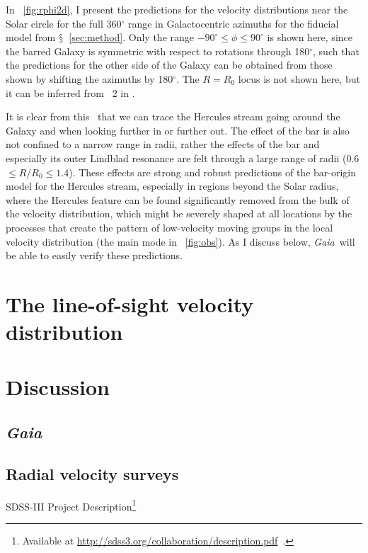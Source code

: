 \documentclass[12pt,preprint]{aastex}
\newcommand{\sectionname}{$\mathsection$}
\newcommand{\Gaia}{\emph{Gaia}}
\newcommand{\Ro}{\ensuremath{R_0}}
\begin{document}
In \figurename~\ref{fig:rphi2d}, I present the predictions for the
velocity distributions near the Solar circle for the full
360$^{\circ}$ range in Galactocentric azimuths for the fiducial model
from \sectionname~\ref{sec:method}. Only the range $-90^{\circ} \leq
\phi \leq 90^{\circ}$ is shown here, since the barred Galaxy is
symmetric with respect to rotations through 180$^{\circ}$, such that
the predictions for the other side of the Galaxy can be obtained from
those shown by shifting the azimuths by 180$^{\circ}$. The $R = \Ro$
locus is not shown here, but it can be inferred from \figurename~2 in
\citet{dehnen00a}.

It is clear from this \figurename\ that we can trace the Hercules
stream going around the Galaxy and when looking further in or further
out. The effect of the bar is also not confined to a narrow range in
radii, rather the effects of the bar and especially its outer Lindblad
resonance are felt through a large range of radii (0.6 $\leq R/\Ro \leq
1.4$). These effects are strong and robust predictions of the
bar-origin model for the Hercules stream, especially in regions beyond
the Solar radius, where the Hercules feature can be found
significantly removed from the bulk of the velocity distribution,
which might be severely shaped at all locations by the processes that
create the pattern of low-velocity moving groups in the local velocity
distribution (the main mode in \figurename~\ref{fig:obs}). As I
discuss below, \Gaia\ will be able to easily verify these predictions.




\section{The line-of-sight velocity distribution}


\section{Discussion}

\subsection{\Gaia}

\subsection{Radial velocity surveys}

SDSS-III Project Description\footnote{Available at
  \url{http://sdss3.org/collaboration/description.pdf}~.}
\end{document}
